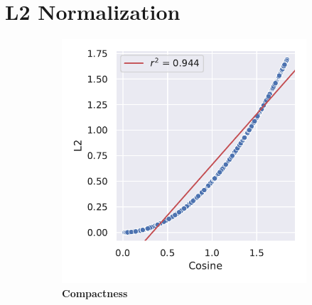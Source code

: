 \section{L2 Normalization} \label{sec:2.4}

\blindtext

\begin{figure}
    \begin{adjustbox}{minipage=\dimexpr{}\fboxrule,fbox}
        \begin{subfigure}[b]{0.475\textwidth}
            \includegraphics[width=\textwidth]{PCA/Difference_Distance_Calculation.pdf}
            \caption[Compactness]{\textbf{Compactness}}
            \label{fig:2.4.1a}
        \end{subfigure}
        \hfill
        \begin{subfigure}[b]{0.475\textwidth}

\end{subfigure}
\end{adjustbox}
\end{figure}

